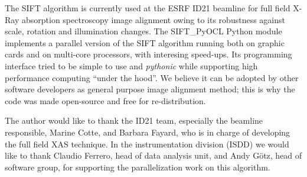 \documentclass[preprint]{iucr}
\begin{document}
The SIFT algorithm is currently used at the ESRF ID21 beamline for full field
X-Ray absorption spectroscopy image alignment owing to its robustness against
scale, rotation and illumination changes.
The SIFT\_PyOCL Python module implements a parallel version of the SIFT
algorithm running both on graphic cards and on multi-core processors, with
interesing speed-ups.
Its programming interface tried to be simple to use and \emph{pythonic} while
supporting high performance computing ``under the hood''.
We believe it can be adopted by other software developers as general purpose  
image alignment method; this is why the code was made open-source and free for
re-distribution.



The author would like to thank the ID21 team, especially the beamline
responsible, Marine Cotte, and Barbara Fayard, who is in charge of developing
the full field XAS technique.
In the instrumentation division (ISDD) we would like to thank Claudio Ferrero,
head of data analysis unit, and Andy G\"otz, head of software group, for
supporting the parallelization work on this algorithm.



\end{document}
